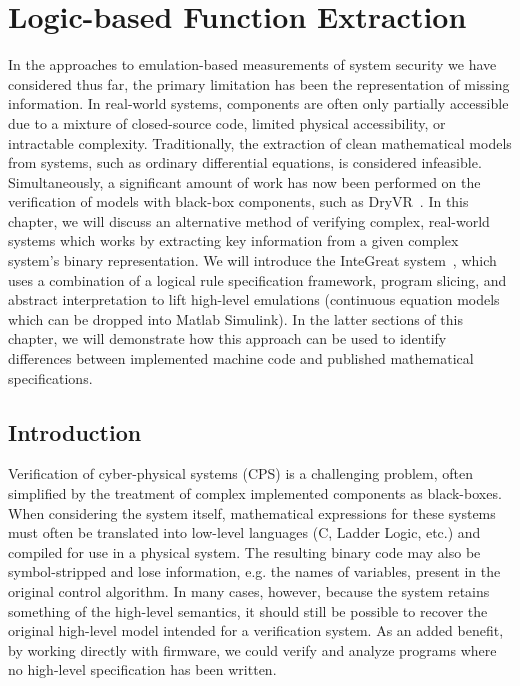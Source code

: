 \chapter{Logic-based Function Extraction}
\label{chap:integreat}

In the approaches to emulation-based measurements of system security we have considered thus far, the primary limitation has been the representation of missing information.
In real-world systems, components are often only partially accessible due to a mixture of closed-source code, limited physical accessibility, or intractable complexity.
Traditionally, the extraction of clean mathematical models from systems, such as ordinary differential equations, is considered infeasible.
Simultaneously, a significant amount of work has now been performed on the verification of models with black-box components, such as DryVR~\cite{fan2017dryvr}.
In this chapter, we will discuss an alternative method of verifying complex, real-world systems which works by extracting key information from a given complex system's binary representation.
We will introduce the InteGreat system~\cite{bland2023integreat}, which uses a combination of a logical rule specification framework, program slicing, and abstract interpretation to lift high-level emulations (continuous equation models which can be dropped into Matlab Simulink).
In the latter sections of this chapter, we will demonstrate how this approach can be used to identify differences between implemented machine code and published mathematical specifications.

\section{Introduction}

Verification of cyber-physical systems (CPS) is a challenging problem, often simplified by the treatment of complex implemented components as black-boxes.
When considering the system itself, mathematical expressions for these systems must often be translated into low-level languages (C, Ladder Logic, etc.) and compiled for use in a physical system.
The resulting binary code may also be symbol-stripped and lose information, e.g. the names of variables, present in the original control algorithm.
In many cases, however, because the system retains something of the high-level semantics, it should still be possible to recover the original high-level model intended for a verification system.
As an added benefit, by working directly with firmware, we could verify and analyze programs where no high-level specification has been written.

